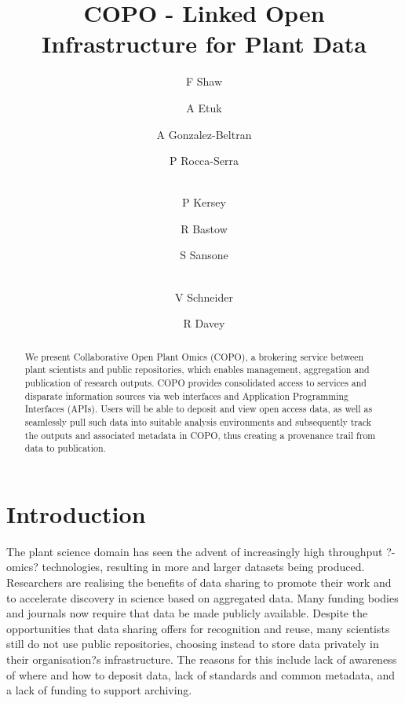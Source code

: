 \documentclass[runningheads,a4paper]{llncs}
\begin{document}
\title{COPO - Linked Open Infrastructure for Plant Data}

\author{F Shaw  \and A Etuk  \and A Gonzalez-Beltran
  \and P Rocca-Serra \and\\
  P  Kersey \and R Bastow  \and S Sansone \and\\
  V Schneider \and R Davey }
%


\maketitle

\vspace*{-0.2in}
\begin{abstract}
  We present Collaborative Open Plant Omics (COPO), a brokering
  service between plant scientists and public repositories, which
  enables management, aggregation and publication of research
  outputs. COPO provides consolidated access to services and disparate
  information sources via web interfaces and Application Programming
  Interfaces (APIs). Users will be able to deposit and view open
  access data, as well as seamlessly pull such data into suitable
  analysis environments and subsequently track the outputs and
  associated metadata in COPO, thus creating a provenance trail from
  data to publication.
\end{abstract}

\vspace*{-0.3in}
\section{Introduction}
\vspace*{-0.1in}
The plant science domain has seen the advent of increasingly high
throughput ?-omics? technologies, resulting in more and larger
datasets being produced. Researchers are realising the benefits of
data sharing to promote their work and to accelerate discovery in
science based on aggregated data. Many funding bodies and journals now
require that data be made publicly available. Despite the
opportunities that data sharing offers for recognition and reuse, many
scientists still do not use public repositories, choosing instead to
store data privately in their organisation?s infrastructure. The
reasons for this include lack of awareness of where and how to deposit
data, lack of standards and common metadata, and a lack of funding to
support archiving.
\end{document}
